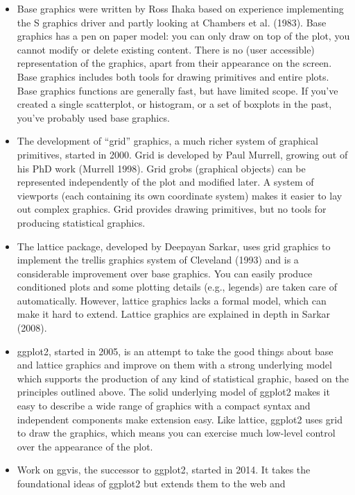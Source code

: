 \begin{itemize}
\item
  Base graphics were written by Ross Ihaka based on experience
  implementing the S graphics driver and partly looking at Chambers et
  al. (1983). Base graphics has a pen on paper model: you can only draw
  on top of the plot, you cannot modify or delete existing content.
  There is no (user accessible) representation of the graphics, apart
  from their appearance on the screen. Base graphics includes both tools
  for drawing primitives and entire plots. Base graphics functions are
  generally fast, but have limited scope. If you've created a single
  scatterplot, or histogram, or a set of boxplots in the past, you've
  probably used base graphics. 
\item
  The development of ``grid'' graphics, a much richer system of
  graphical primitives, started in 2000. Grid is developed by Paul
  Murrell, growing out of his PhD work (Murrell 1998). Grid grobs
  (graphical objects) can be represented independently of the plot and
  modified later. A system of viewports (each containing its own
  coordinate system) makes it easier to lay out complex graphics. Grid
  provides drawing primitives, but no tools for producing statistical
  graphics. 
\item
  The lattice package, developed by Deepayan Sarkar, uses grid graphics
  to implement the trellis graphics system of Cleveland (1993) and is a
  considerable improvement over base graphics. You can easily produce
  conditioned plots and some plotting details (e.g., legends) are taken
  care of automatically. However, lattice graphics lacks a formal model,
  which can make it hard to extend. Lattice graphics are explained in
  depth in Sarkar (2008). 
\item
  ggplot2, started in 2005, is an attempt to take the good things about
  base and lattice graphics and improve on them with a strong underlying
  model which supports the production of any kind of statistical
  graphic, based on the principles outlined above. The solid underlying
  model of ggplot2 makes it easy to describe a wide range of graphics
  with a compact syntax and independent components make extension easy.
  Like lattice, ggplot2 uses grid to draw the graphics, which means you
  can exercise much low-level control over the appearance of the plot.
\item
  Work on ggvis, the successor to ggplot2, started in 2014. It takes the
  foundational ideas of ggplot2 but extends them to the web and

\end{itemize}
